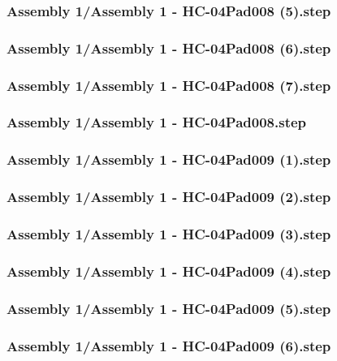 \documentclass[a4paper,12pt]{article}
\begin{document}
\subsubsection{Assembly 1/Assembly 1 - HC-04Pad008 (5).step}

\subsubsection{Assembly 1/Assembly 1 - HC-04Pad008 (6).step}

\subsubsection{Assembly 1/Assembly 1 - HC-04Pad008 (7).step}

\subsubsection{Assembly 1/Assembly 1 - HC-04Pad008.step}

\subsubsection{Assembly 1/Assembly 1 - HC-04Pad009 (1).step}

\subsubsection{Assembly 1/Assembly 1 - HC-04Pad009 (2).step}

\subsubsection{Assembly 1/Assembly 1 - HC-04Pad009 (3).step}

\subsubsection{Assembly 1/Assembly 1 - HC-04Pad009 (4).step}

\subsubsection{Assembly 1/Assembly 1 - HC-04Pad009 (5).step}

\subsubsection{Assembly 1/Assembly 1 - HC-04Pad009 (6).step}

\end{document}
